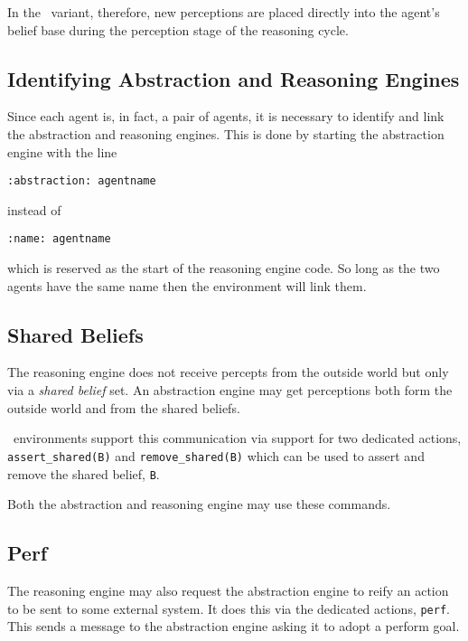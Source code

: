 In the \eass\ variant, therefore, new
perceptions are placed directly into the agent's
belief base during the perception stage of the reasoning
cycle. 

\subsection{Identifying Abstraction and Reasoning Engines}
Since each agent is, in fact, a pair of agents, it is necessary to
identify and link the abstraction and reasoning engines.  This is done
by starting the abstraction engine with the line 
\begin{verbatim}
:abstraction: agentname
\end{verbatim} 
instead of 
\begin{verbatim}
:name: agentname
\end{verbatim} 
which is reserved as the start of the reasoning engine code.  So long
as the two agents have the same name then the environment will link
them. 

\subsection{Shared Beliefs}
The reasoning engine does not receive
percepts from the outside world but only via a
\emph{shared belief} set.  An abstraction engine may get perceptions both form the outside world and from the
shared beliefs. 

\eass\ environments support this communication via support for two
dedicated actions,
\lstinline{assert_shared(B)} and
\lstinline{remove_shared(B)} which can be
used to assert and remove the shared belief,
\lstinline{B}. 

Both the abstraction and reasoning engine may use these
commands. 

\subsection{Perf}
The reasoning engine may also request the
abstraction engine to reify an action to be
sent to some external system.  It does this via the dedicated actions,
\texttt{perf}.  This sends a message to the abstraction engine asking
it to adopt a perform goal. 

